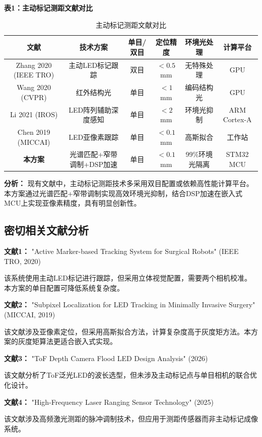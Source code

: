 \documentclass[12pt, a4paper]{ctexart}
\begin{document}
\textbf{表1：主动标记测距文献对比}

\begin{table}[htbp]
\centering
\caption{主动标记测距文献对比}
\begin{tabular}{cccccc}
\toprule
文献 & 技术方案 & 单目/双目 & 定位精度 & 环境光处理 & 计算平台 \\
\midrule
Zhang 2020 (IEEE TRO) & 主动LED标记跟踪 & 双目 & $<0.5$mm & 无特殊处理 & GPU \\
Wang 2020 (CVPR) & 红外结构光 & 单目 & $<1$mm & 编码结构光 & GPU \\
Li 2021 (IROS) & LED阵列辅助深度感知 & 单目 & $<2$mm & 环境光抑制 & ARM Cortex-A \\
Chen 2019 (MICCAI) & LED亚像素跟踪 & 单目 & $<0.1$mm & 高斯拟合 & 工作站 \\
\textbf{本方案} & 光谱匹配+窄带调制+DSP加速 & 单目 & $<0.1$mm & 99\%环境光隔离 & STM32 MCU \\
\bottomrule
\end{tabular}
\end{table}

\textbf{分析：} 现有文献中，主动标记测距技术多采用双目配置或依赖高性能计算平台。本方案通过光谱匹配+窄带调制实现高效环境光抑制，结合DSP加速在嵌入式MCU上实现亚像素精度，具有明显创新性。

\subsection{密切相关文献分析}

\textbf{文献1：} "Active Marker-based Tracking System for Surgical Robots" (IEEE TRO, 2020)

该系统使用主动LED标记进行跟踪，但采用立体视觉配置，需要两个相机校准。本方案的单目配置可降低系统复杂度。

\textbf{文献2：} "Subpixel Localization for LED Tracking in Minimally Invasive Surgery" (MICCAI, 2019)

该文献涉及亚像素定位，但采用高斯拟合方法，计算复杂度高于灰度矩方法。本方案的灰度矩算法更适合嵌入式实现。

\textbf{文献3：} "ToF Depth Camera Flood LED Design Analysis" (2026)

该文献分析了ToF泛光LED的波长选型，但未涉及主动标记点与单目相机的联合优化设计。

\textbf{文献4：} "High-Frequency Laser Ranging Sensor Technology" (2025)

该文献涉及高频激光测距的脉冲调制技术，但应用于测距传感器而非主动标记成像系统。
\end{document}
